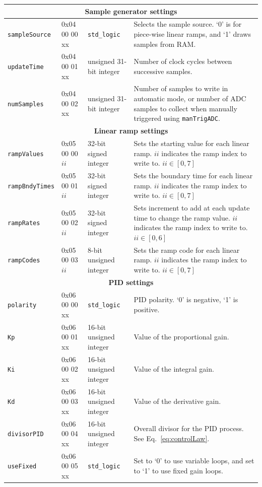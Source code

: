 \documentclass{article}
\begin{document}
\begin{longtable}[c]{|l|l|l|p{6cm}|}
	\multicolumn{4}{|c|}{\textbf{Sample generator settings}}\\
	\hline
	\verb|sampleSource|		&0x04 00 00 xx				&\verb|std_logic|				&Selects the sample source.  `0' is for piece-wise linear ramps, and `1' draws samples from RAM.\\\hline
	\verb|updateTime|		&0x04 00 01 xx				&unsigned 31-bit integer		&Number of clock cycles between successive samples.\\\hline
	\verb|numSamples|		&0x04 00 02 xx				&unsigned 31-bit integer		&Number of samples to write in automatic mode, or number of ADC samples to collect when manually triggered using \verb|manTrigADC|.\\\hline
	
	\multicolumn{4}{|c|}{\textbf{Linear ramp settings}}\\
	\hline
	\verb|rampValues|		&0x05 00 00 $ii$				&32-bit signed integer		&Sets the starting value for each linear ramp.  $ii$ indicates the ramp index to write to.  $ii \in [0,7]$\\\hline
	\verb|rampBndyTimes|	&0x05 00 01 $ii$				&32-bit signed integer		&Sets the boundary time for each linear ramp.  $ii$ indicates the ramp index to write to.  $ii \in [0,7]$\\\hline
	\verb|rampRates|		&0x05 00 02 $ii$				&32-bit signed integer		&Sets increment to add at each update time to change the ramp value.  $ii$ indicates the ramp index to write to.  $ii \in [0,6]$\\\hline
	\verb|rampCodes|		&0x05 00 03 $ii$				&8-bit unsigned integer		&Sets the ramp code for each linear ramp.  $ii$ indicates the ramp index to write to.  $ii \in [0,7]$\\\hline
	
	\multicolumn{4}{|c|}{\textbf{PID settings}}\\
	\hline
	\verb|polarity|			&0x06 00 00 xx					&\verb|std_logic|			&PID polarity.  `0' is negative, `1' is positive.\\\hline
	\verb|Kp|				&0x06 00 01 xx					&16-bit unsigned integer	&Value of the proportional gain.\\\hline
	\verb|Ki|				&0x06 00 02 xx					&16-bit unsigned integer	&Value of the integral gain.\\\hline
	\verb|Kd|				&0x06 00 03 xx					&16-bit unsigned integer	&Value of the derivative gain.\\\hline
	\verb|divisorPID|		&0x06 00 04 xx					&16-bit unsigned integer	&Overall divisor for the PID process.  See Eq.~\eqref{eq:controlLaw}.\\\hline
	\verb|useFixed|			&0x06 00 05 xx					&\verb|std_logic|			&Set to `0' to use variable loops, and set to `1' to use fixed gain loops.\\\hline
	

\end{longtable}
\end{document}
